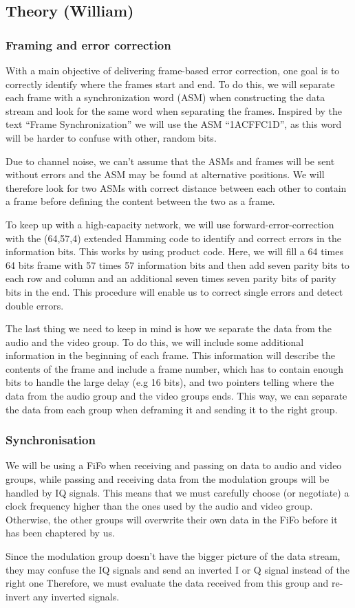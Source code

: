 \subsection{Theory (William)}

\subsubsection{Framing and error correction}
With a main objective of delivering frame-based error correction, one goal is to correctly identify where the frames start and end. To do this, we will separate each frame with a synchronization word (ASM) when constructing the data stream and look for the same word when separating the frames. Inspired by the text “Frame Synchronization” we will use the ASM “1ACFFC1D”, as this word will be harder to confuse with other, random bits.

Due to channel noise, we can’t assume that the ASMs and frames will be sent without errors and the ASM may be found at alternative positions. We will therefore look for two ASMs with correct distance between each other to contain a frame before defining the content between the two as a frame.

To keep up with a high-capacity network, we will use forward-error-correction with the (64,57,4) extended Hamming code to identify and correct errors in the information bits. This works by using product code. Here, we will fill a 64 times 64 bits frame with 57 times 57 information bits and then add seven parity bits to each row and column and an additional seven times seven parity bits of parity bits in the end. This procedure will enable us to correct single errors and detect double errors.

The last thing we need to keep in mind is how we separate the data from the audio and the video group. To do this, we will include some additional information in the beginning of each frame. This information will describe the contents of the frame and include a frame number, which has to contain enough bits to handle the large delay (e.g 16 bits), and two pointers telling where the data from the audio group and the video groups ends. This way, we can separate the data from each group when deframing it and sending it to the right group.

\subsubsection{Synchronisation}
We will be using a FiFo when receiving and passing on data to audio and video groups, while passing and receiving data from the modulation groups will be handled by IQ signals. This means that we must carefully choose (or negotiate) a clock frequency higher than the ones used by the audio and video group. Otherwise, the other groups will overwrite their own data in the FiFo before it has been chaptered by us.

Since the modulation group doesn’t have the bigger picture of the data stream, they may confuse the IQ signals and send an inverted I or Q signal instead of the right one Therefore, we must evaluate the data received from this group and re-invert any inverted signals.
